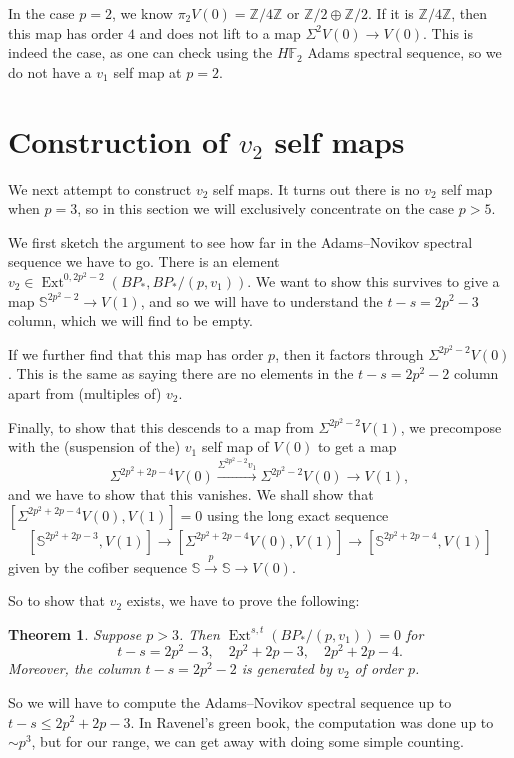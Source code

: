 \documentclass{shortart}
\newtheorem*{thm}{Theorem}
\theoremstyle{definition}
\newcommand\F{\mathbb{F}}
\newcommand\Z{\mathbb{Z}}
\newcommand\Sph{\mathbb{S}}
\DeclareMathOperator\Ext{Ext}
\begin{document}
In the case $p = 2$, we know $\pi_2 V(0) = \Z/4\Z$ or $\Z/2 \oplus \Z/2$. If it is $\Z/4\Z$, then this map has order $4$ and does not lift to a map $\Sigma^2 V(0) \to V(0)$. This is indeed the case, as one can check using the $H\F_2$ Adams spectral sequence, so we do not have a $v_1$ self map at $p = 2$.

\section{Construction of \texorpdfstring{$v_2$}{v2} self maps}
We next attempt to construct $v_2$ self maps. It turns out there is no $v_2$ self map when $p = 3$, so in this section we will exclusively concentrate on the case $p > 5$.

We first sketch the argument to see how far in the Adams--Novikov spectral sequence we have to go. There is an element $v_2 \in \Ext^{0, 2p^2 - 2}(BP_*, BP_*/(p, v_1))$. We want to show this survives to give a map $\Sph^{2p^2 - 2} \to V(1)$, and so we will have to understand the $t - s = 2p^2 - 3$ column, which we will find to be empty.

If we further find that this map has order $p$, then it factors through $\Sigma^{2p^2 - 2} V(0)$. This is the same as saying there are no elements in the $t - s = 2p^2 - 2$ column apart from (multiples of) $v_2$.

Finally, to show that this descends to a map from $\Sigma^{2p^2 - 2} V(1)$, we precompose with the (suspension of the) $v_1$ self map of $V(0)$ to get a map
\[
  \Sigma^{2p^2 + 2p - 4} V(0) \overset{\Sigma^{2p^2 - 2} v_1}{\longrightarrow} \Sigma^{2p^2 - 2} V(0) \longrightarrow V(1),
\]
and we have to show that this vanishes. We shall show that $[\Sigma^{2p^2 + 2p - 4} V(0), V(1)] = 0$ using the long exact sequence
\[
  [\Sph^{2p^2 + 2p - 3}, V(1)] \to [\Sigma^{2p^2 + 2p - 4} V(0), V(1)] \to [\Sph^{2p^2 + 2p - 4}, V(1)]
\]
given by the cofiber sequence $\Sph \overset{p}{\rightarrow} \Sph \rightarrow V(0)$.

So to show that $v_2$ exists, we have to prove the following:
\begin{thm}
  Suppose $p > 3$. Then $\Ext^{s, t}(BP_*/(p, v_1)) = 0$ for
  \[
    t - s = 2p^2 - 3, \quad 2p^2 + 2p - 3,\quad 2p^2 + 2p - 4.
  \]
  Moreover, the column $t - s = 2p^2 - 2$ is generated by $v_2$ of order $p$.
\end{thm}

So we will have to compute the Adams--Novikov spectral sequence up to $t - s \leq 2p^2 + 2p - 3$. In Ravenel's green book, the computation was done up to $\sim p^3$, but for our range, we can get away with doing some simple counting.
\end{document}
